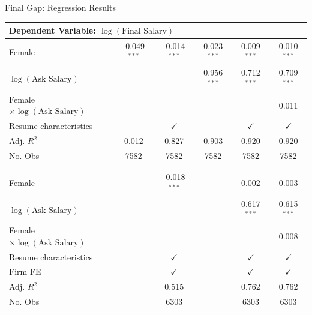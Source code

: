 \begin{frame}{Final Gap: Regression Results}
    
    \begin{table}[h!]
        \scriptsize
        \begin{center}
            \begin{tabular}{lccccc}
                \multicolumn{6}{l}{Dependent Variable: \textcolor{frenchlilac!45!white}{$\log(\text{Final Salary})$}} \\
                \hline
                Female & \textcolor{frenchlilac!45!white}{-0.049$^{***}$} & \textcolor{frenchlilac!45!white}{-0.014$^{***}$} & \textcolor{frenchlilac!45!white}{0.023$^{***}$} & \textcolor{frenchlilac!45!white}{0.009$^{***}$} & \textcolor{frenchlilac!45!white}{0.010$^{***}$}\\
                $\log(\text{Ask Salary})$ & & & {0.956$^{***}$} & {0.712$^{***}$} & {0.709$^{***}$} \\
                Female $\times \log(\text{Ask Salary})$  & & & & &  \textcolor{frenchlilac!45!white}{0.011}\\
                \hline 
                Resume characteristics & & $\checkmark$ & & $\checkmark$& $\checkmark$\\
                Adj. $R^2$ & 0.012 & 0.827 & 0.903 & 0.920 & 0.920 \\
                No. Obs & 7582 & 7582 & 7582 & 7582 & 7582 \\
                & \\ \hline\hline 
                & \\
                Female & & \textcolor{frenchlilac!45!white}{-0.018$^{***}$} &  & \textcolor{frenchlilac!45!white}{0.002} & \textcolor{frenchlilac!45!white}{0.003}\\
                $\log(\text{Ask Salary})$ & & &  & {0.617$^{***}$} & {0.615$^{***}$} \\
                Female $\times \log(\text{Ask Salary})$  & & & & &  \textcolor{frenchlilac!45!white}{0.008}\\
                \hline 
                Resume characteristics & & $\checkmark$ & & $\checkmark$& $\checkmark$\\
                \textcolor{frenchlilac!45!white}{Firm FE} & &$\checkmark$ &  & $\checkmark$ & $\checkmark$ \\
                Adj. $R^2$ & & 0.515 & & 0.762 & 0.762 \\
                No. Obs & & 6303 & & 6303 & 6303 \\

            \end{tabular}
        \end{center}
    \end{table}
\end{frame}

